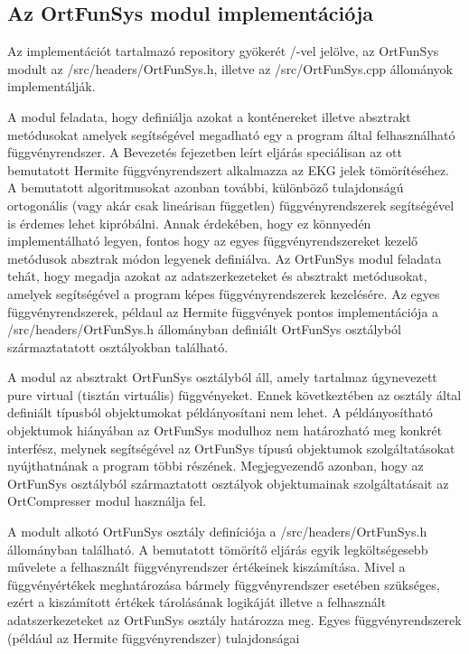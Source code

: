 \documentclass[oneside,titlepage,12pt,a4paper]{report}
\begin{document}
\subsection{Az OrtFunSys modul implementációja}

Az implementációt tartalmazó repository gyökerét /-vel jelölve, az OrtFunSys modult  az /src/headers/OrtFunSys.h, illetve az /src/OrtFunSys.cpp állományok implementálják. \par A modul feladata, hogy definiálja azokat a konténereket illetve absztrakt metódusokat amelyek segítségével 
megadható egy a program által felhasználható függvényrendszer. A Bevezetés fejezetben leírt eljárás speciálisan az ott bemutatott Hermite függvényrendszert 
alkalmazza az EKG jelek tömörítéséhez. A bemutatott algoritmusokat azonban további, különböző tulajdonságú ortogonális (vagy akár csak lineárisan független) 
függvényrendszerek segítségével is érdemes lehet kipróbálni. Annak érdekében, hogy ez könnyedén implementálható legyen, fontos hogy az egyes függvényrendszereket kezelő metódusok absztrak módon legyenek definiálva.
Az OrtFunSys modul feladata tehát, hogy megadja azokat az adatszerkezeteket és absztrakt metódusokat, amelyek segítségével a program képes függvényrendszerek kezelésére. Az egyes függvényrendszerek, példaul az Hermite függvények pontos implementációja
a /src/headers/OrtFunSys.h állományban definiált OrtFunSys osztályból származtatatott osztályokban található.  \par
A modul az absztrakt OrtFunSys osztályból áll, amely tartalmaz úgynevezett pure virtual (tisztán virtuális) függvényeket. Ennek következtében az osztály által definiált típusból objektumokat példányosítani nem lehet. A példányosítható objektumok hiányában
az OrtFunSys modulhoz nem határozható meg konkrét interfész, melynek segítségével az OrtFunSys típusú objektumok szolgáltatásokat nyújthatnának a program többi részének. Megjegyezendő azonban, hogy az OrtFunSys osztályból származtatott osztályok objektumainak szolgáltatásait az OrtCompresser
modul használja fel. 
\par  
A modult alkotó OrtFunSys osztály definíciója a /src/headers/OrtFunSys.h állományban található. A bemutatott tömörítő eljárás egyik legköltségesebb művelete
a felhasznált függvényrendszer értékeinek kiszámítása. Mivel a függvényértékek meghatározása bármely függvényrendszer esetében szükséges, ezért a kiszámított értékek
tárolásának logikáját illetve a felhasznált adatszerkezeteket az OrtFunSys osztály határozza meg. Egyes függvényrendszerek (például az Hermite függvényrendszer) tulajdonságai
\end{document}
